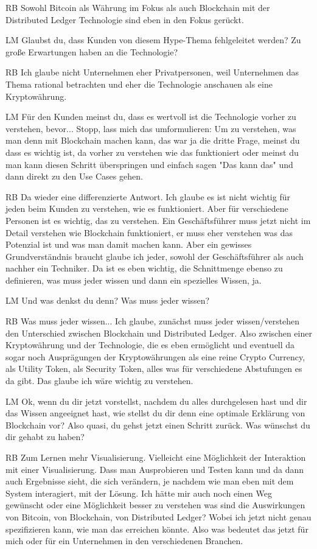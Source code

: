 \begin{xlist}
 \item[RB] Sowohl Bitcoin als Währung im Fokus als auch Blockchain mit der Distributed Ledger Technologie sind eben in den Fokus gerückt.
 \item[LM] Glaubst du, dass Kunden von diesem Hype-Thema fehlgeleitet werden? Zu große Erwartungen haben an die Technologie? 
 \item[RB] Ich glaube nicht Unternehmen eher Privatpersonen, weil Unternehmen das Thema rational betrachten und eher die Technologie anschauen als eine Kryptowährung.
 \item[LM] Für den Kunden meinst du, dass es wertvoll ist die Technologie vorher zu verstehen, bevor... Stopp, lass mich das umformulieren: Um zu verstehen, was man denn mit Blockchain machen kann, das war ja die dritte Frage, meinst du dass es wichtig ist, da vorher zu verstehen wie das funktioniert oder meinst du man kann diesen Schritt überspringen und einfach sagen "Das kann das" und dann direkt zu den Use Cases gehen.
 \item[RB] Da wieder eine differenzierte Antwort. Ich glaube es ist nicht wichtig für jeden beim Kunden zu verstehen, wie es funktioniert.  Aber für verschiedene Personen ist es wichtig, das zu verstehen. Ein Geschäftsführer muss jetzt nicht im Detail verstehen wie Blockchain funktioniert, er muss eher verstehen was das Potenzial ist und was man damit machen kann. Aber ein gewisses Grundverständnis braucht glaube ich jeder, sowohl der Geschäftsführer als auch nachher ein Techniker. Da ist es eben wichtig, die Schnittmenge ebenso zu definieren, was muss jeder wissen und dann ein spezielles Wissen, ja.
 \item[LM] Und was denkst du denn? Was muss jeder wissen?
 \item[RB] Was muss jeder wissen... Ich glaube, zunächst muss jeder wissen/verstehen den Unterschied zwischen Blockchain und Distributed Ledger. Also zwischen einer Kryptowährung und der Technologie, die es eben ermöglicht und eventuell da sogar noch Ausprägungen der Kryptowährungen als eine reine Crypto Currency, als Utility Token, als Security Token, alles was für verschiedene Abstufungen es da gibt. Das glaube ich wäre wichtig zu verstehen. 
 \item[LM] Ok, wenn du dir jetzt vorstellst, nachdem du alles durchgelesen hast und dir das Wissen angeeignet hast, wie stellst du dir denn eine optimale Erklärung von Blockchain vor? Also quasi, du gehst jetzt einen Schritt zurück. Was wünschst du dir gehabt zu haben?
 \item[RB] Zum Lernen mehr Visualisierung. Vielleicht eine Möglichkeit der Interaktion mit einer Visualisierung. Dass man Ausprobieren und Testen kann und da dann auch Ergebnisse sieht, die sich verändern, je nachdem wie man eben mit dem System interagiert, mit der Lösung. Ich hätte mir auch noch einen Weg gewünscht oder eine Möglichkeit besser zu verstehen was sind die Auswirkungen von Bitcoin, von Blockchain, von Distributed Ledger? Wobei ich jetzt nicht genau spezifizieren kann, wie man das erreichen könnte. Also was bedeutet das jetzt für mich oder für ein Unternehmen in den verschiedenen Branchen.

\end{xlist}
